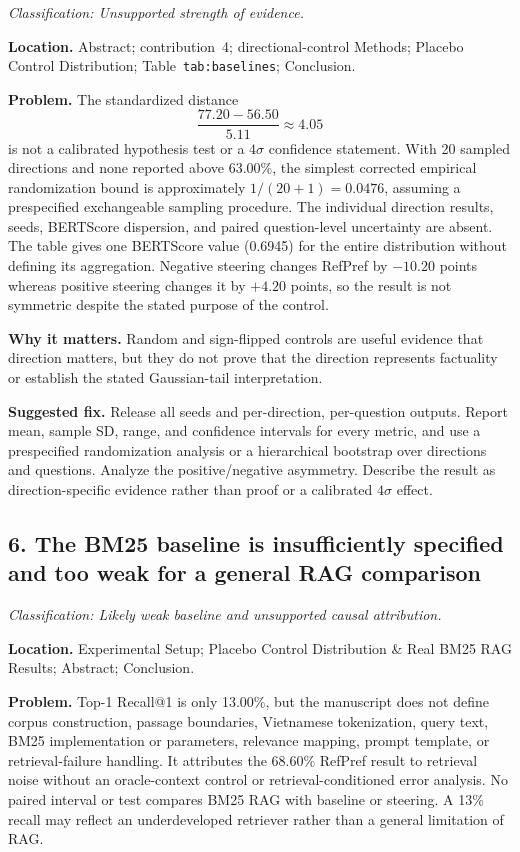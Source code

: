 \documentclass[11pt]{article}
\newcommand{\findinglabel}[1]{\textbf{#1}}
\newcommand{\classification}[1]{\textit{Classification: #1.}}
\begin{document}
\classification{Unsupported strength of evidence}

\findinglabel{Location.} Abstract; contribution~4; directional-control Methods; Placebo Control Distribution; Table~\texttt{tab:baselines}; Conclusion.

\findinglabel{Problem.} The standardized distance
\[
\frac{77.20-56.50}{5.11}\approx4.05
\]
is not a calibrated hypothesis test or a $4\sigma$ confidence statement.  With 20 sampled directions and none reported above 63.00\%, the simplest corrected empirical randomization bound is approximately $1/(20+1)=0.0476$, assuming a prespecified exchangeable sampling procedure.  The individual direction results, seeds, BERTScore dispersion, and paired question-level uncertainty are absent.  The table gives one BERTScore value (0.6945) for the entire distribution without defining its aggregation.  Negative steering changes RefPref by $-10.20$ points whereas positive steering changes it by $+4.20$ points, so the result is not symmetric despite the stated purpose of the control.

\findinglabel{Why it matters.} Random and sign-flipped controls are useful evidence that direction matters, but they do not prove that the direction represents factuality or establish the stated Gaussian-tail interpretation.

\findinglabel{Suggested fix.} Release all seeds and per-direction, per-question outputs.  Report mean, sample SD, range, and confidence intervals for every metric, and use a prespecified randomization analysis or a hierarchical bootstrap over directions and questions.  Analyze the positive/negative asymmetry.  Describe the result as direction-specific evidence rather than proof or a calibrated $4\sigma$ effect.

\subsection*{6. The BM25 baseline is insufficiently specified and too weak for a general RAG comparison}

\classification{Likely weak baseline and unsupported causal attribution}

\findinglabel{Location.} Experimental Setup; Placebo Control Distribution \& Real BM25 RAG Results; Abstract; Conclusion.

\findinglabel{Problem.} Top-1 Recall@1 is only 13.00\%, but the manuscript does not define corpus construction, passage boundaries, Vietnamese tokenization, query text, BM25 implementation or parameters, relevance mapping, prompt template, or retrieval-failure handling.  It attributes the 68.60\% RefPref result to retrieval noise without an oracle-context control or retrieval-conditioned error analysis.  No paired interval or test compares BM25 RAG with baseline or steering.  A 13\% recall may reflect an underdeveloped retriever rather than a general limitation of RAG.
\end{document}

